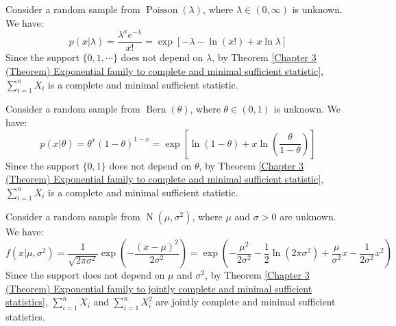 \documentclass{huhtakm-template-book-v2}
\DeclareMathOperator{\Bern}{Bern}
\DeclareMathOperator{\Poisson}{Poisson}
\DeclareMathOperator{\N}{N}
\begin{document}
\begin{eg}
	\label{Chapter 3 (Example) Complete and minimal sufficient statistic of Poisson distribution}
	Consider a random sample from $\Poisson(\lambda)$, where $\lambda\in(0,\infty)$ is unknown. We have:
	\begin{equation*}
		p(x|\lambda)=\frac{\lambda^{x}e^{-\lambda}}{x!}=\exp[-\lambda-\ln(x!)+x\ln{\lambda}]
	\end{equation*}
	Since the support $\{0,1,\cdots\}$ does not depend on $\lambda$, by Theorem \ref{Chapter 3 (Theorem) Exponential family to complete and minimal sufficient statistic}, $\sum_{i=1}^{n}X_{i}$ is a complete and minimal sufficient statistic.
\end{eg}
\begin{eg}
	Consider a random sample from $\Bern(\theta)$, where $\theta\in(0,1)$ is unknown. We have:
	\begin{equation*}
		p(x|\theta)=\theta^{x}(1-\theta)^{1-x}=\exp\left[\ln(1-\theta)+x\ln\left(\frac{\theta}{1-\theta}\right)\right]
	\end{equation*}
	Since the support $\{0,1\}$ does not depend on $\theta$, by Theorem \ref{Chapter 3 (Theorem) Exponential family to complete and minimal sufficient statistic}, $\sum_{i=1}^{n}X_{i}$ is a complete and minimal sufficient statistic.
\end{eg}
\begin{eg}
	Consider a random sample from $\N(\mu,\sigma^{2})$, where $\mu$ and $\sigma>0$ are unknown. We have:
	\begin{equation*}
		f(x|\mu,\sigma^{2})=\frac{1}{\sqrt{2\pi\sigma^{2}}}\exp\left(-\frac{(x-\mu)^{2}}{2\sigma^{2}}\right)=\exp\left(-\frac{\mu^{2}}{2\sigma^{2}}-\frac{1}{2}\ln(2\pi\sigma^{2})+\frac{\mu}{\sigma^{2}}x-\frac{1}{2\sigma^{2}}x^{2}\right)
	\end{equation*}
	Since the support does not depend on $\mu$ and $\sigma^{2}$, by Theorem \ref{Chapter 3 (Theorem) Exponential family to jointly complete and minimal sufficient statistics}, $\sum_{i=1}^{n}X_{i}$ and $\sum_{i=1}^{n}X_{i}^{2}$ are jointly complete and minimal sufficient statistics.
\end{eg}

\newpage
\end{document}
